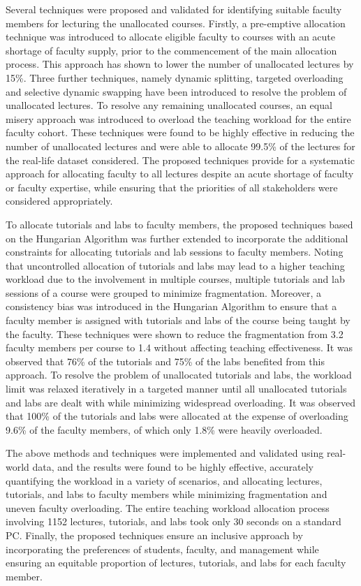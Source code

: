 Several techniques were proposed and validated for identifying suitable faculty members for lecturing the unallocated courses. Firstly, a pre-emptive allocation technique was introduced to allocate eligible faculty to courses with an acute shortage of faculty supply, prior to the commencement of the main allocation process. This approach has shown to lower the number of unallocated lectures by 15\%. Three further techniques, namely dynamic splitting, targeted overloading and selective dynamic swapping have been introduced to resolve the problem of unallocated lectures. To resolve any remaining unallocated courses, an equal misery approach was introduced to overload the teaching workload for the entire faculty cohort. These techniques were found to be highly effective in reducing the number of unallocated lectures and were able to allocate 99.5\% of the lectures for the real-life dataset considered. The proposed techniques provide for a systematic approach for allocating faculty to all lectures despite an acute shortage of faculty or faculty expertise, while ensuring that the priorities of all stakeholders were considered appropriately.

To allocate tutorials and labs to faculty members, the proposed techniques based on the Hungarian Algorithm was further extended to incorporate the additional constraints for allocating tutorials and lab sessions to faculty members. Noting that uncontrolled allocation of tutorials and labs may lead to a higher teaching workload due to the involvement in multiple courses, multiple tutorials and lab sessions of a course were grouped to minimize fragmentation. Moreover, a consistency bias was introduced in the Hungarian Algorithm to ensure that a faculty member is assigned with tutorials and labs of the course being taught by the faculty. These techniques were shown to reduce the fragmentation from 3.2 faculty members per course to 1.4 without affecting teaching effectiveness. It was observed that 76\% of the tutorials and 75\% of the labs benefited from this approach. To resolve the problem of unallocated tutorials and labs, the workload limit was relaxed iteratively in a targeted manner until all unallocated tutorials and labs are dealt with while minimizing widespread overloading. It was observed that 100\% of the tutorials and labs were allocated at the expense of overloading 9.6\% of the faculty members, of which only 1.8\% were heavily overloaded.

The above methods and techniques were implemented and validated using real-world data, and the results were found to be highly effective, accurately quantifying the workload in a variety of scenarios, and allocating lectures, tutorials, and labs to faculty members while minimizing fragmentation and uneven faculty overloading. The entire teaching workload allocation process involving 1152 lectures, tutorials, and labs took only 30 seconds on a standard PC. Finally, the proposed techniques ensure an inclusive approach by incorporating the preferences of students, faculty, and management while ensuring an equitable proportion of lectures, tutorials, and labs for each faculty member.

